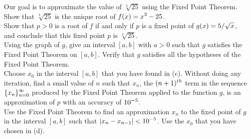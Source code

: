 \begin{question}
Our goal is to approximate the value of $\sqrt[3]{25}$ using the Fixed
Point Theorem.\\
 Show that $\sqrt[3]{25}$ is the unique root of
$\displaystyle f(x) = x^3-25$.\\
 Show that $p>0$ is a root of $f$ if and only if $p$ is a
fixed point of $\displaystyle g(x) = 5/\sqrt{x}$, and conclude that
this fixed point $p$ is $\sqrt[3]{25}$. \\
 Using the graph of $g$, give an interval $[a,b]$ with $a>0$
such that $g$ satisfies the Fixed Point Theorem on $[a,b]$.  Verify
that $g$ satisfies all the hypotheses of the Fixed Point Theorem.\\
 Choose $x_0$ in the interval $[a,b]$ that you have found in (c).
Without doing any iteration, find a small value of $n$ such that $x_n$,
the $\displaystyle (n+1)^{th}$ term in the sequence
$\displaystyle \{x_n\}_{n=0}^\infty$ produced by
the Fixed Point Theorem applied to the function $g$, is an approximation of 
$p$ with an accuracy of $\displaystyle 10^{-5}$.\\ 
 Use the Fixed Point Theorem to find an approximation $x_n$ to
the fixed point of $g$ in the interval $[a,b]$ such that
$\displaystyle |x_n - x_{n-1}| < 10^{-5}$.  Use the $x_0$ that you
have chosen in (d).
\end{question}

